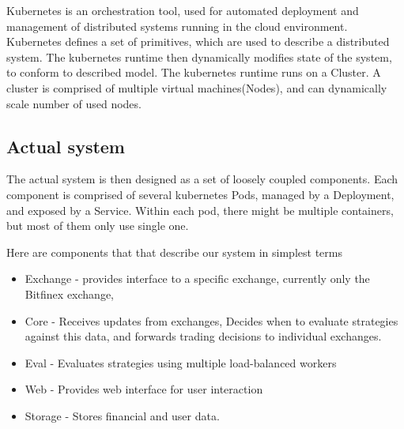 \documentclass{ExcelAtFIT}
\begin{document}
    Kubernetes is an orchestration tool, used for automated deployment and management of distributed systems running in the cloud environment.
    Kubernetes defines a set of primitives, which are used to describe a distributed system. The kubernetes
    runtime then dynamically modifies state of the system, to conform to described model. The kubernetes runtime
    runs on a Cluster. A cluster is comprised of multiple virtual machines(Nodes), and can dynamically scale number
    of used nodes.
%
%

    \subsection{Actual system}
    The actual system is then designed as a set of loosely coupled components. Each component is comprised of several kubernetes Pods,
    managed by a Deployment, and exposed by a Service. Within each pod, there might be multiple containers, but most of them only use single one.

    Here are components that that describe our system in simplest terms
    \begin{itemize}
        \item Exchange - provides interface to a specific exchange, currently only the Bitfinex exchange,
        \item Core - Receives updates from exchanges, Decides when to evaluate strategies against this data, and forwards
            trading decisions to individual exchanges.
        \item Eval - Evaluates strategies using multiple load-balanced workers
        \item Web - Provides web interface for user interaction
        \item Storage - Stores financial and user data.
    \end{itemize}
\end{document}
